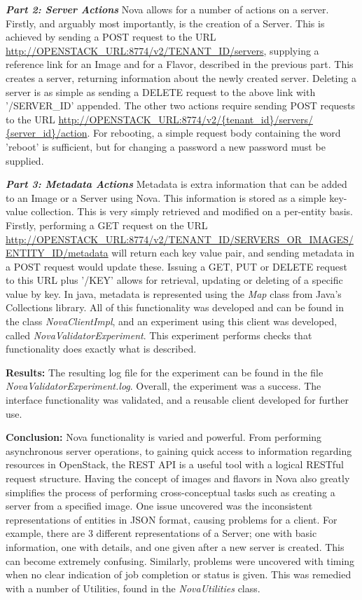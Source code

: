 \textbf{\textit{Part 2: Server Actions}}
Nova allows for a number of actions on a server. Firstly, and arguably most importantly, is the creation of a Server. This is achieved by sending a POST request to the URL 
\url{http://OPENSTACK_URL:8774/v2/TENANT_ID/servers},
supplying a reference link for an Image and for a Flavor, described in the previous part.  This creates a server, returning information about the newly created server. 
Deleting a server is as simple as sending a DELETE request to the above link with '/SERVER\_ID' appended. 
The other two actions require sending POST requests to the URL 
\url{http://OPENSTACK_URL:8774/v2/​{tenant_id}​/servers/​{server_id}​/action}.
For rebooting, a simple request body containing the word 'reboot' is sufficient, but for changing a password a new password must be supplied.  

\textbf{\textit{Part 3: Metadata Actions}}
Metadata is extra information that can be added to an Image or a Server using Nova. This information is stored as a simple key-value collection. 
This is very simply retrieved and modified on a per-entity basis. 
Firstly, performing a GET request on the URL 
\url{http://OPENSTACK_URL:8774/v2/TENANT_ID/SERVERS_OR_IMAGES/ENTITY_ID/metadata}
will return each key value pair, and sending metadata in a POST request would update these. Issuing a GET, PUT or DELETE request to this URL plus '/KEY' allows for retrieval, updating or deleting of a specific value by key. 
In java, metadata is represented using the \textit{Map} class from Java's Collections library.
All of this functionality was developed and can be found in the class \textit{NovaClientImpl}, and an experiment using this client was developed, called \textit{NovaValidatorExperiment}. This experiment performs checks that functionality does exactly what is described.  
 
\textbf{Results:} The resulting log file for the experiment can be found in the file \textit{NovaValidatorExperiment.log}. Overall, the experiment was a success. The interface functionality was validated, and a reusable client developed for further use. 

\textbf{Conclusion:} Nova functionality is varied and powerful. From performing asynchronous server operations, to gaining quick access to information regarding resources in OpenStack, the REST API is a useful tool with a logical RESTful request structure. Having the concept of images and flavors in Nova also greatly simplifies the process of performing cross-conceptual tasks such as creating a server from a specified image.
One issue uncovered was the inconsistent representations of entities in JSON format, causing problems for a client. For example, there are 3 different representations of a Server; one with basic information, one with details, and one given after a new server is created. This can become extremely confusing. Similarly, problems were uncovered with timing when no clear indication of job completion or status is given. This was remedied with a number of Utilities, found in the \textit{NovaUtilities} class. 

